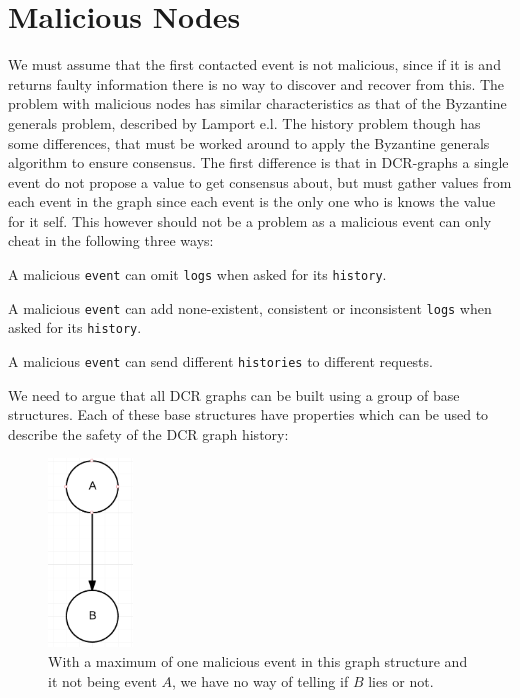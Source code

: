 \section{Malicious Nodes}
We must assume that the first contacted event is not malicious, since if it is and returns faulty information there is no way to discover and recover from this. The problem with malicious nodes has similar characteristics as that of the Byzantine generals problem, described by Lamport e.l. The history problem though has some differences, that must be worked around to apply the Byzantine generals algorithm to ensure consensus. The first difference is that in DCR-graphs a single event do not propose a value to get consensus about, but must gather values from each event in the graph since each event is the only one who is knows the value for it self. This however should not be a problem as a malicious event can only cheat in the following three ways:
\begin{definition}\label{malevent-type-omit}
	A malicious \texttt{event} can omit \texttt{logs} when asked for its \texttt{history}.
\end{definition}
\begin{definition}\label{malevent-type-add}
	A malicious \texttt{event} can add none-existent, consistent or inconsistent \texttt{logs} when asked for its \texttt{history}.
\end{definition}
\begin{definition}\label{malevent-type-responddifferent}
	A malicious \texttt{event} can send different \texttt{histories} to different requests.
\end{definition}


We need to argue that all DCR graphs can be built using a group of base structures. Each of these base structures have properties which can be used to describe the safety of the DCR graph history:

\begin{figure}[H]
	\centering
	\includegraphics[height=5cm]{figures/GraphStructure_OneToOne}
	\caption{With a maximum of one malicious event in this graph structure and it not being event $A$, we have no way of telling if $B$ lies or not.}
\end{figure}

